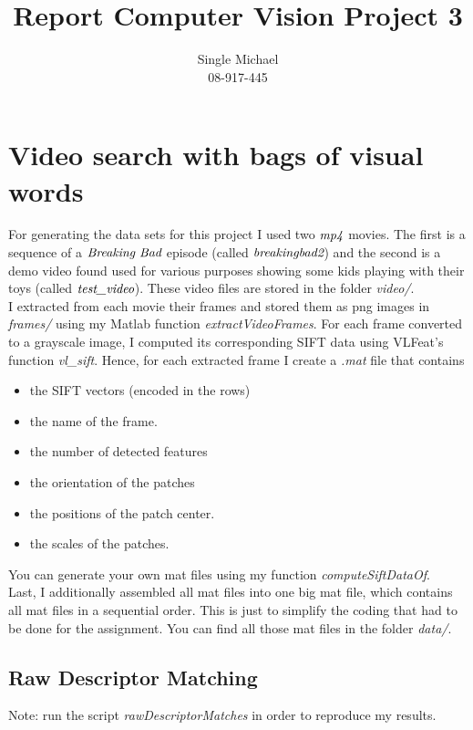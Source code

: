 \documentclass{paper}
\title{Report Computer Vision Project 3}
\author{Single Michael\\08-917-445}
\begin{document}
\maketitle


\section{Video search with bags of visual words}
For generating the data sets for this project I used two $\emph{mp4}$ movies. The first is a sequence of a $\emph{Breaking Bad}$ episode (called $\emph{breakingbad2}$) and the second is a demo video found used for various purposes showing some kids playing with their toys 
(called $\emph{test\_video}$). These video files are stored in the folder \emph{video/}. \\

I extracted from each movie their frames and stored them as png images in \emph{frames/} using my Matlab function \emph{extractVideoFrames}. For each frame converted to a grayscale image, I computed its corresponding SIFT data using VLFeat's function \emph{vl\_sift}.
Hence, for each extracted frame I create a \emph{.mat} file that contains 

\begin{itemize}
    \item the SIFT vectors (encoded in the rows)
    \item the name of the frame.
    \item the number of detected features
    \item the orientation of the patches
    \item the positions of the patch center.
    \item the scales of the patches.
\end{itemize}

You can generate your own mat files using my function \emph{computeSiftDataOf}. \\

Last, I additionally assembled all mat files into one big mat file, which contains all mat files in a sequential order. This is just to simplify the coding that had to be done for the assignment. You can find all those mat files in the folder \emph{data/}. \\

\subsection{Raw Descriptor Matching}
Note: run the script \emph{rawDescriptorMatches} in order to reproduce my results. \\
\end{document}
